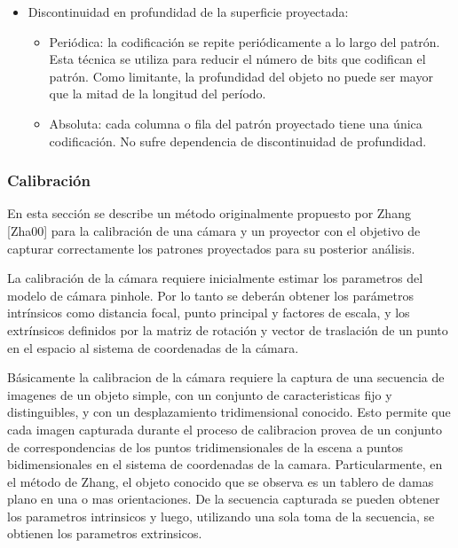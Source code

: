 \begin{itemize}
\begin{itemize}
   \end{itemize}
   \item Discontinuidad en profundidad de la superficie proyectada:
   \begin{itemize}
	\item Periódica: la codificación se repite periódicamente a lo largo del patrón. Esta técnica se utiliza para reducir el número de bits que codifican el patrón. Como limitante, la profundidad del objeto no puede ser mayor que la mitad de la longitud del período.%
	\item Absoluta: cada columna o fila del patrón proyectado tiene una única codificación. No sufre dependencia de discontinuidad de profundidad.
   \end{itemize}
\end{itemize}

\subsubsection{Calibración}

En esta sección se describe un método originalmente propuesto por Zhang [Zha00] para la calibración de una cámara y un proyector con el objetivo de capturar correctamente los patrones proyectados para su posterior análisis. 

La calibración de la cámara requiere inicialmente estimar los parametros del modelo de cámara pinhole. Por lo tanto se deberán obtener los parámetros intrínsicos como distancia focal, punto principal y factores de escala, y los extrínsicos definidos por la matriz de rotación y vector de traslación de un punto en el espacio al sistema de coordenadas de la cámara. 

Básicamente la calibracion de la cámara requiere la captura de una secuencia de imagenes de un objeto simple, con un conjunto de caracteristicas fijo y distinguibles, y con un desplazamiento tridimensional conocido. Esto permite que cada imagen capturada durante el proceso de calibracion provea de un conjunto de correspondencias de los puntos tridimensionales de la escena a puntos bidimensionales en el sistema de coordenadas de la camara. Particularmente, en el método de Zhang, el objeto conocido que se observa es un tablero de damas plano en una o mas orientaciones. De la secuencia capturada se pueden obtener los parametros intrinsicos y luego, utilizando una sola toma de la secuencia,  se obtienen los parametros extrinsicos.

